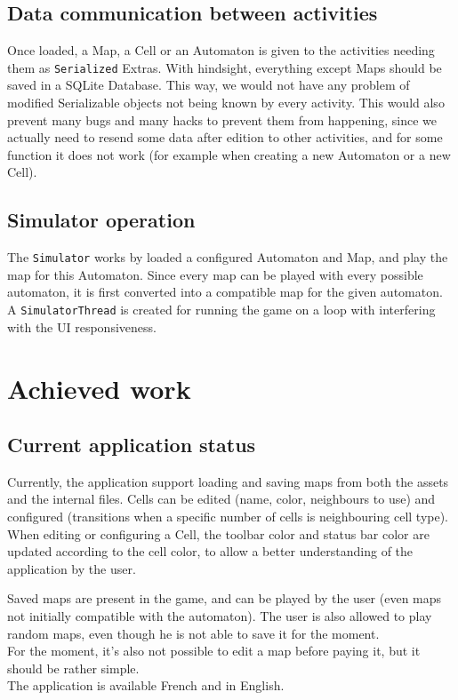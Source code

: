 \documentclass{report}
\begin{document}
\section{Data communication between activities}
\par Once loaded, a Map, a Cell or an Automaton is given to the activities needing them as \texttt{Serialized} Extras. With hindsight, everything except Maps should be saved in a SQLite Database. This way, we would not have any problem of modified Serializable objects not being known by every activity. This would also prevent many bugs and many hacks to prevent them from happening, since we actually need to resend some data after edition to other activities, and for some function it does not work (for example when creating a new Automaton or a new Cell).

\section{Simulator operation}
\par The \texttt{Simulator} works by loaded a configured Automaton and Map, and play the map for this Automaton. Since every map can be played with every possible automaton, it is first converted into a compatible map for the given automaton. A \texttt{SimulatorThread} is created for running the game on a loop with interfering with the UI responsiveness. 

\chapter{Achieved work}
\section{Current application status}
\par Currently, the application support loading and saving maps from both the assets and the internal files. Cells can be edited (name, color, neighbours to use) and configured (transitions when a specific number of cells is neighbouring cell type). When editing or configuring a Cell, the toolbar color and status bar color are updated according to the cell color, to allow a better understanding of the application by the user.\\
\par Saved maps are present in the game, and can be played by the user (even maps not initially compatible with the automaton). The user is also allowed to play random maps, even though he is not able to save it for the moment.\\
For the moment, it's also not possible to edit a map before paying it, but it should be rather simple.\\
The application is available French and in English. 
\end{document}
